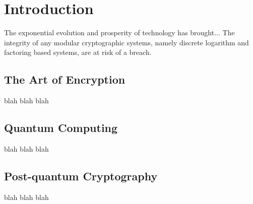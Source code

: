 \section{Introduction}
The exponential evolution and prosperity of technology has brought...
The integrity of any modular cryptographic systems, namely discrete logarithm and factoring based systems, are at risk of a breach. 

\subsection{The Art of Encryption}
blah blah blah

\subsection{Quantum Computing}
blah blah blah

\subsection{Post-quantum Cryptography}
blah blah blah